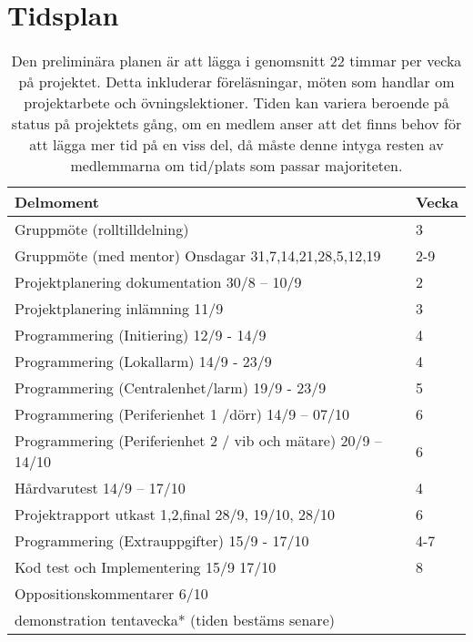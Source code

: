 \documentclass[a4paper]{article}
\begin{document}
\section{Tidsplan}
\begin{table}[h]
\begin{tabular}{ | p{5.5cm}| p{2cm} | }
    \hline
        \rowcolor{lightgray}
    \centering Delmoment & \multicolumn{1}{|c|}{Vecka}\\
\hline
Gruppmöte (rolltilldelning)          & 3   \\
Gruppmöte (med mentor)      Onsdagar 31,7,14,21,28,5,12,19      & 2-9 \\
Projektplanering dokumentation      30/8 -- 10/9     & 2   \\
Projektplanering inlämning          11/9            & 3   \\
Programmering (Initiering)           12/9  - 14/9   & 4   \\

Programmering (Lokallarm)           14/9 - 23/9   & 4   \\
Programmering (Centralenhet/larm)   19/9 - 23/9   & 5   \\

Programmering (Periferienhet 1 /dörr)      14/9 -- 07/10 & 6   \\
Programmering (Periferienhet 2 / vib och mätare)      20/9 -- 14/10 & 6   \\


Hårdvarutest                        14/9 -- 17/10                 & 4   \\
Projektrapport utkast 1,2,final     28/9, 19/10, 28/10            & 6   \\

Programmering (Extrauppgifter)      15/9 - 17/10   & 4-7 \\

Kod test och Implementering          15/9   17/10   & 8   \\

Oppositionskommentarer              6/10 &  \\
demonstration                        tentavecka* (tiden bestäms senare) &  \\
\hline


\end{tabular}
\caption{\label{Tidsplan}Den preliminära planen är att lägga i genomsnitt 22 timmar per vecka på projektet. Detta 
inkluderar föreläsningar, möten som handlar om projektarbete och övningslektioner.
Tiden kan variera beroende på status på projektets gång, om en medlem anser att det finns behov för att lägga mer tid på en viss del, då måste denne intyga resten av medlemmarna om tid/plats som passar majoriteten.}
\end{table}
\end{document}
